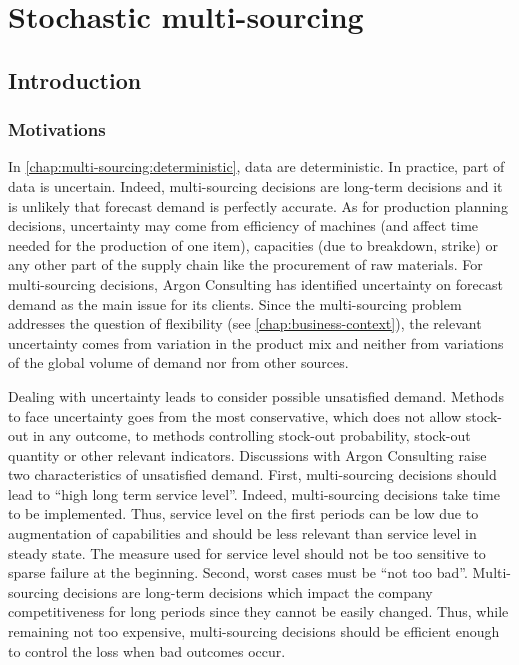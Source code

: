 \chapter{Stochastic multi-sourcing}
\label{chap:multi-sourcing:stochastic}


\section{Introduction}
\label{sec:multi-sourcing:stochastic:introduction}


\subsection{Motivations}
\label{sec:multi-sourcing:stochastic:introduction:motivations}


In \cref{chap:multi-sourcing:deterministic}, data are deterministic.
In practice, part of data is uncertain.
Indeed, multi-sourcing decisions are long-term decisions and it is unlikely that forecast demand is perfectly accurate.
As for production planning decisions, uncertainty may come from efficiency of machines (and affect time needed for the production of one item), capacities (due to breakdown, strike) or any other part of the supply chain like the procurement of raw materials.
For multi-sourcing decisions, Argon Consulting has identified uncertainty on forecast demand as the main issue for its clients.
Since the multi-sourcing problem addresses the question of flexibility (see \cref{chap:business-context}), the relevant uncertainty comes from variation in the product mix and neither from variations of the global volume of demand nor from other sources.


Dealing with uncertainty leads to consider possible unsatisfied demand.
Methods to face uncertainty goes from the most conservative, which does not allow stock-out in any outcome, to methods controlling stock-out probability, stock-out quantity or other relevant indicators.
Discussions with Argon Consulting raise two characteristics of unsatisfied demand.
First, multi-sourcing decisions should lead to ``high long term service level''.
Indeed, multi-sourcing decisions take time to be implemented.
Thus, service level on the first periods can be low due to augmentation of capabilities and should be less relevant than service level in steady state.
The measure used for service level should not be too sensitive to sparse failure at the beginning.
Second, worst cases must be ``not too bad''.
Multi-sourcing decisions are long-term decisions which impact the company competitiveness for long periods since they cannot be easily changed.
Thus, while remaining not too expensive, multi-sourcing decisions should be efficient enough to control the loss when bad outcomes occur.


